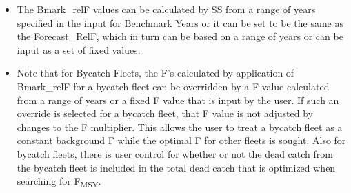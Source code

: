 \begin{itemize}
	\item The Bmark\_relF values can be calculated by SS from a range of years specified in the input for Benchmark Years or it can be set to be the same as the Forecast\_RelF, which in turn can be based on a range of years or can be input as a set of fixed values.
	\item Note that for Bycatch Fleets, the F’s calculated by application of Bmark\_relF for a bycatch fleet can be overridden by a F value calculated from a range of years or a fixed F value that is input by the user.  If such an override is selected for a bycatch fleet, that F value is not adjusted by changes to the F multiplier.  This allows the user to treat a bycatch fleet as a constant background F while the optimal F for other fleets is sought.  Also for bycatch fleets, there is user control for whether or not the dead catch from the bycatch fleet is included in the total dead catch that is optimized when searching for F\textsubscript{MSY}.
\end{itemize}

